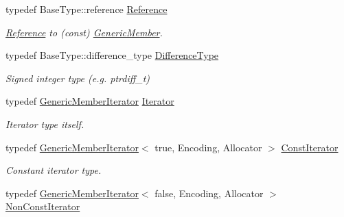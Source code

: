 \begin{DoxyCompactItemize}
\mbox{\label{classGenericMemberIterator_ae80f6b601eb9e24f73aa75fb32b35c65}} 
typedef Base\+Type\+::reference \hyperlink{classGenericMemberIterator_ae80f6b601eb9e24f73aa75fb32b35c65}{Reference}
\begin{DoxyCompactList}\small\item\em \hyperlink{structReference}{Reference} to (const) \hyperlink{structGenericMember}{Generic\+Member}. \end{DoxyCompactList}\item 
\mbox{\label{classGenericMemberIterator_a902b99c8ae351cd7626514dc5f30740a}} 
typedef Base\+Type\+::difference\+\_\+type \hyperlink{classGenericMemberIterator_a902b99c8ae351cd7626514dc5f30740a}{Difference\+Type}
\begin{DoxyCompactList}\small\item\em Signed integer type (e.\+g. {\ttfamily ptrdiff\+\_\+t}) \end{DoxyCompactList}\item 
\mbox{\label{classGenericMemberIterator_ad1cf1ecf6210b47906c9f179c893a8b8}} 
typedef \hyperlink{classGenericMemberIterator}{Generic\+Member\+Iterator} \hyperlink{classGenericMemberIterator_ad1cf1ecf6210b47906c9f179c893a8b8}{Iterator}
\begin{DoxyCompactList}\small\item\em Iterator type itself. \end{DoxyCompactList}\item 
\mbox{\label{classGenericMemberIterator_ae5be27a73dce0be58ee2776db896d591}} 
typedef \hyperlink{classGenericMemberIterator}{Generic\+Member\+Iterator}$<$ true, Encoding, Allocator $>$ \hyperlink{classGenericMemberIterator_ae5be27a73dce0be58ee2776db896d591}{Const\+Iterator}
\begin{DoxyCompactList}\small\item\em Constant iterator type. \end{DoxyCompactList}\item 
\mbox{\label{classGenericMemberIterator_abc26eb06f2962765b11dcd06ce84ac02}} 
typedef \hyperlink{classGenericMemberIterator}{Generic\+Member\+Iterator}$<$ false, Encoding, Allocator $>$ \hyperlink{classGenericMemberIterator_abc26eb06f2962765b11dcd06ce84ac02}{Non\+Const\+Iterator}

\end{DoxyCompactItemize}
